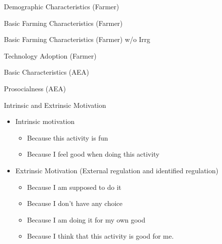 \documentclass[aspectratio=169]{beamer}
\begin{document}
\begin{frame}{Demographic Characteristics (Farmer)}
	\centering
	\scalebox{0.55}{}
	
\end{frame}

\begin{frame}{Basic Farming Characteristics (Farmer)}
	\centering
	\scalebox{0.5}{}
	
\end{frame}


\begin{frame}{Basic Farming Characteristics (Farmer) w/o Irrg}
\centering
\scalebox{0.5}{}

\end{frame}

\begin{frame}{Technology Adoption (Farmer)}
	\centering
	\scalebox{0.6}{}
	
\end{frame}

\begin{frame}{Basic Characteristics (AEA)}
	\centering
	\scalebox{0.55}{}
	
\end{frame}

\begin{frame}{Prosocialness (AEA)}
	\centering
	\scalebox{0.6}{}
	
\end{frame}

\begin{frame}{Intrinsic and Extrinsic Motivation}
	\begin{itemize}
		\item Intrinsic motivation
		\begin{itemize}
			\item Because this activity is fun 
			\item Because I feel good when doing this activity
			\vspace{0.3cm}
		\end{itemize}
		\item Extrinsic Motivation (External regulation and identified regulation)
		\begin{itemize}
			\item Because I am supposed to do it
			\item Because I don't have any choice
			\item Because I am doing it for my own good 
			\item Because I think that this activity is good for me. 
		\end{itemize}
		
		
		
	\end{itemize}
\end{frame}
\end{document}

